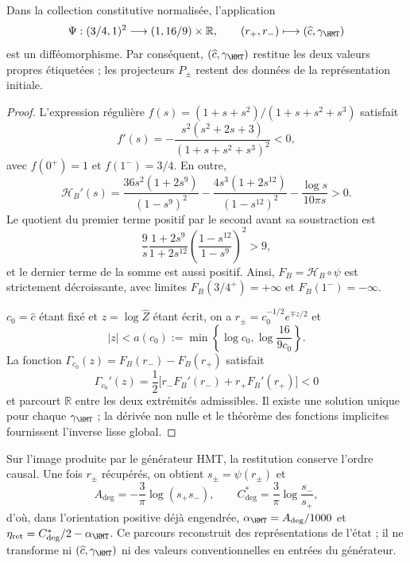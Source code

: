 \begin{theorem}
\label{v:thm:restitucion-c-gamma}
Dans la collection constitutive normalisée, l’application
\begin{equation}
 \Psi:(3/4,1)^2\longrightarrow(1,16/9)\times\mathbb R,
 \qquad
 (r_+,r_-)\longmapsto(\widehat c,\gamma_{\HMT})
 \label{v:eq:mapa-c-gamma}
\end{equation}
est un difféomorphisme. Par conséquent, $(\widehat c,\gamma_{\HMT})$ restitue
les deux valeurs propres étiquetées ; les projecteurs $P_\pm$ restent des
données de la représentation initiale.
\end{theorem}
\begin{proof}
L’expression régulière $f(s)=(1+s+s^2)/(1+s+s^2+s^3)$ satisfait
\[
 f'(s)=-\frac{s^2(s^2+2s+3)}{(1+s+s^2+s^3)^2}<0,
\]
avec $f(0^+)=1$ et $f(1^-)=3/4$. En outre,
\begin{equation}
 \mathcal H_B'(s)=
 \frac{36s^2(1+2s^9)}{(1-s^9)^2}
 -\frac{4s^3(1+2s^{12})}{(1-s^{12})^2}
 -\frac{\log s}{10\pi s}>0.
 \label{v:eq:monotonia-hb}
\end{equation}
Le quotient du premier terme positif par le second avant sa soustraction
est
\[
 \frac9s\frac{1+2s^9}{1+2s^{12}}
 \left(\frac{1-s^{12}}{1-s^9}\right)^2>9,
\]
et le dernier terme de la somme est aussi positif. Ainsi,
$F_B=\mathcal H_B\circ\psi$ est strictement décroissante, avec limites
$F_B(3/4^+)=+\infty$ et $F_B(1^-)=-\infty$.

$c_0=\widehat c$ étant fixé et $z=\log\widehat Z$ étant écrit, on a
$r_\pm=c_0^{-1/2}e^{\mp z/2}$ et
\[
 |z|<a(c_0):=\min\!\left\{\log c_0,
 \log\frac{16}{9c_0}\right\}.
\]
La fonction $\Gamma_{c_0}(z)=F_B(r_-)-F_B(r_+)$ satisfait
\[
 \Gamma_{c_0}'(z)=\frac12
 \bigl[r_-F_B'(r_-)+r_+F_B'(r_+)\bigr]<0
\]
et parcourt $\mathbb R$ entre les deux extrémités admissibles. Il existe une
solution unique pour chaque $\gamma_{\HMT}$ ; la dérivée non nulle et le théorème
des fonctions implicites fournissent l’inverse lisse global.
\end{proof}

Sur l’image produite par le générateur HMT, la restitution conserve
l’ordre causal. Une fois $r_\pm$ récupérés, on obtient
$s_\pm=\psi(r_\pm)$ et
\begin{equation}
 A_{\deg}=-\frac3\pi\log(s_+s_-),\qquad
 C^*_{\deg}=\frac3\pi\log\frac{s_-}{s_+},
 \label{v:eq:restitucion-angular-constitutiva}
\end{equation}
d’où, dans l’orientation positive déjà engendrée,
$\alpha_{\HMT}=A_{\deg}/1000$ et
$\eta_{\mathrm{ret}}=C^*_{\deg}/2-\alpha_{\HMT}$. Ce parcours
reconstruit des représentations de l’état ; il ne transforme ni
$(\widehat c,\gamma_{\HMT})$ ni des valeurs conventionnelles en entrées du
générateur.


